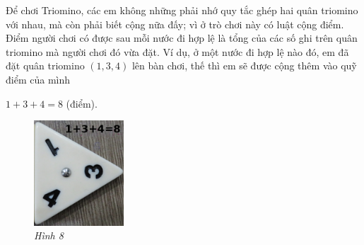 	\begin{multicols}{2}
	Để chơi Triomino, các em không những phải nhớ quy tắc ghép hai quân triomino với nhau, mà còn phải biết cộng nữa đấy; vì ở trò chơi này có luật cộng điểm. Điểm người chơi có được sau mỗi nước đi hợp lệ là tổng của các số ghi trên quân triomino mà người chơi đó vừa đặt. Ví dụ, ở một nước đi hợp lệ nào đó, em đã đặt quân triomino $(1, 3, 4)$ lên bàn chơi, thế thì em sẽ được cộng thêm vào quỹ điểm của mình
	\vskip 0.1cm
	\centerline{$1+3+4=8$ (điểm).}
	\vskip 0.1cm
	\begin{figure}[H]
		\vspace*{-5pt}
		\centering
		\captionsetup{labelformat=empty, justification=centering}
		\includegraphics[width=0.3\textwidth]{h6-fix}
		\caption{\textit{\small Hình 8}}
		\vspace*{-5pt}
	\end{figure}
	\end{multicols}
